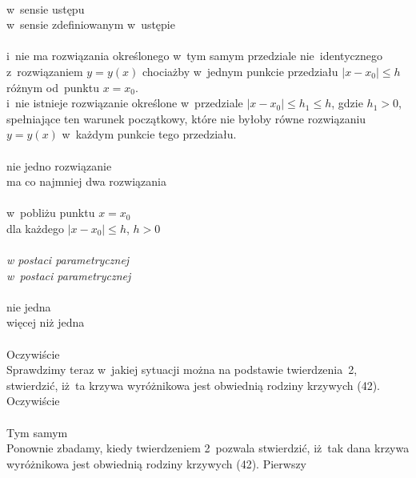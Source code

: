 \documentclass[a4paper,11pt]{article}
\numberwithin{equation}{section}
\begin{document}
\noindent
{} \\
\Jest  w~sensie ustępu \\
\Powin w~sensie zdefiniowanym w~ustępie \\
 \\
\Jest  i~nie ma rozwiązania określonego w~tym samym przedziale
nie~identycznego z~rozwiązaniem $y = y( x )$ chociażby w~jednym
punkcie przedziału $| x - x_{ 0 } | \leq h$ różnym od~punktu $x = x_{ 0 }$. \\
\Powin i~nie istnieje rozwiązanie określone w~przedziale
$| x - x_{ 0 } | \leq h_{ 1 } \leq h$, gdzie $h_{ 1 } > 0$, spełniające ten warunek
początkowy, które nie byłoby równe rozwiązaniu $y = y( x )$ w~każdym
punkcie tego przedziału. \\
 \\
\Jest  nie jedno rozwiązanie \\
\Powin ma co najmniej dwa rozwiązania \\
 \\
\Jest  w~pobliżu punktu $x = x_{ 0 }$ \\
\Powin dla każdego $| x - x_{ 0 } | \leq h$, $h > 0$ \\
 \\
\Jest  \textit{w \hspace{0.5em} postaci \hspace{0.5em} parametrycznej} \\
\Powin \textit{w~postaci parametrycznej} \\
 \\
\Jest  nie jedna \\
\Powin więcej niż jedna \\
 \\
\Jest  Oczywiście \\
\Powin Sprawdzimy teraz w~jakiej sytuacji można na podstawie twierdzenia~2,
stwierdzić, iż~ta krzywa wyróżnikowa jest obwiednią rodziny krzywych (42).
Oczywiście \\
 \\
\Jest  Tym samym \\
\Powin Ponownie zbadamy, kiedy twierdzeniem 2~pozwala stwierdzić,
iż~tak dana krzywa wyróżnikowa jest obwiednią rodziny krzywych (42).
Pierwszy \\





























\printbibliography





\end{document}
